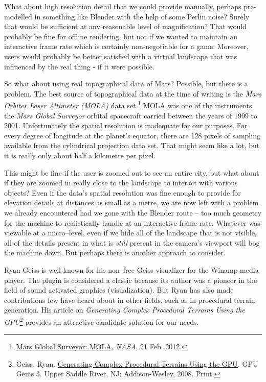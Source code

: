 What about high resolution detail that we could provide manually, perhaps pre-modelled in something like Blender with the help of some Perlin noise? Surely that would be sufficient at any reasonable level of magnification? That would probably be fine for offline rendering, but not if we wanted to maintain an interactive frame rate which is certainly non-negotiable for a game. Moreover, users would probably be better satisfied with a virtual landscape that was influenced by the real thing - if it were possible.

So what about using real topographical data of Mars? Possible, but there is a problem. The best source of topographical data at the time of writing is the {\it Mars Orbiter Laser Altimeter (MOLA)} data set.\footnote{\href{http://pds-geosciences.wustl.edu/missions/mgs/mola.html}{Mars Global Surveyor: MOLA}. {\it NASA}, 21 Feb. 2012.} MOLA was one of the instruments the {\it Mars Global Surveyor} orbital spacecraft carried between the years of 1999 to 2001. Unfortunately the spatial resolution is inadequate for our purposes. For every degree of longitude at the planet's equator, there are 128 pixels of sampling available from the cylindrical projection data set. That might seem like a lot, but it is really only about half a kilometre per pixel.

This might be fine if the user is zoomed out to see an entire city, but what about if they are zoomed in really close to the landscape to interact with various objects? Even if the data's spatial resolution was fine enough to provide for elevation details at distances as small as a metre, we are now left with a problem we already encountered had we gone with the Blender route -- too much geometry for the machine to realistically handle at an interactive frame rate. Whatever was viewable at a micro--level, even if we hide all of the landscape that is not visible, all of the details present in what is {\it still} present in the camera's viewport will bog the machine down. But perhaps there is another approach to consider.

Ryan Geiss is well known for his non--free Geiss visualizer for the Winamp media player. The plugin is considered a classic because its author was a pioneer in the field of sound activated graphics (visualization). But Ryan has also made contributions few have heard about in other fields, such as in procedural terrain generation. His article on {\it Generating Complex Procedural Terrains Using the GPU}\footnote{Geiss, Ryan. \href{http://http.developer.nvidia.com/GPUGems3/gpugems3_ch01.html}{Generating Complex Procedural Terrains Using the GPU}. GPU Gems 3. Upper Saddle River, NJ: Addison-Wesley, 2008. Print.} provides an attractive candidate solution for our needs. 

